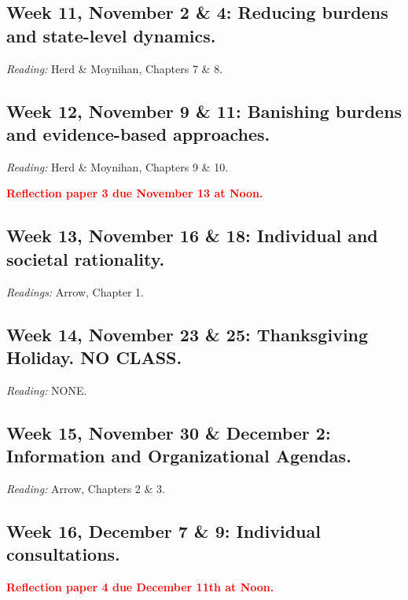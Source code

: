 \documentclass[a4paper,12pt]{article}
\begin{document}
\subsection*{Week 11, November 2 \& 4:  Reducing burdens and state-level dynamics.}
\emph{Reading:} Herd \& Moynihan, Chapters 7 \& 8.

\subsection*{Week 12, November 9 \& 11:  Banishing burdens and evidence-based approaches.}
\emph{Reading:} Herd \& Moynihan, Chapters 9 \& 10.

\textcolor{red}{\textbf{Reflection paper 3 due November 13 at Noon.}}

\subsection*{Week 13, November 16 \& 18:  Individual and societal rationality.}
\emph{Readings:} Arrow, Chapter 1.

\subsection*{Week 14, November 23 \& 25: Thanksgiving Holiday. NO CLASS.}
\emph{Reading:} NONE.

\subsection{Week 15, November 30 \& December 2: Information and Organizational Agendas.}
\emph{Reading:} Arrow, Chapters 2 \& 3.

\subsection{Week 16, December 7 \& 9: Individual consultations.}
\textcolor{red}{\textbf{Reflection paper 4 due December 11th at Noon.}}
\end{document}
